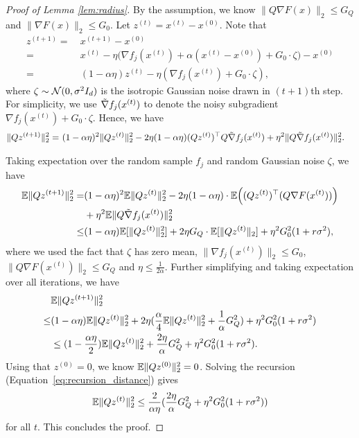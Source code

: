 \begin{proof}[Proof of Lemma \ref{lem:radius}]
By the assumption, we know $\|Q \nabla F(x)\|_2\le G_Q$ and $\| \nabla F(x)\|_2\leq G_0$.
Let $z^{(t)}=x^{(t)}-x^{(0)}$. Note that
\begin{align*}
    z^{(t+1)}=& ~ x^{(t+1)}-x^{(0)}\\
    =& ~ x^{(t)}-\eta\Big(\nabla f_j(x^{(t)})+\alpha(x^{(t)}-x^{(0)})+G_{0}\cdot \zeta\Big)-x^{(0)}\\
    =& ~ (1-\alpha\eta)z^{(t)}-\eta(\nabla f_{j}(x^{(t)})+G_{0}\cdot\zeta ),
\end{align*}
where $\zeta\sim \mathcal N(0,\sigma^{2}I_d)$ is the isotropic Gaussian noise drawn in $(t+1)$th step. 
For simplicity, we use $\Tilde{\nabla} f_j(x^{(t)})$ to denote the noisy subgradient $\nabla f_{j}(x^{(t)})+G_{0}\cdot\zeta$.
Hence, we have
\begin{align*}
    \|Qz^{(t+1)}\|_2^2=& ~ (1-\alpha\eta)^2\|Qz^{(t)}\|_2^2-2\eta(1-\alpha\eta)( Qz^{(t)})^\top Q\Tilde{\nabla} f_j(x^{(t)})+\eta^2\|Q\Tilde{\nabla} f_j(x^{(t)})\|_2^2.
\end{align*}

Taking expectation over the random sample $f_j$ and random Gaussian noise $\zeta$, we have
\begin{align*}
\mathbb{E}\|Qz^{(t+1)}\|_{2}^{2}= & (1-\alpha\eta)^{2}\mathbb{E}\|Qz^{(t)}\|_{2}^{2}-2\eta(1-\alpha\eta)\cdot\mathbb{E}\Big((Qz^{(t)})^{\top}(Q\nabla F(x^{(t)}))\Big) \\
 & +\eta^{2}\mathbb{E}\|Q\Tilde{\nabla} f_j(x^{(t)})\|_{2}^{2}\\
\leq & (1-\alpha\eta)\mathbb{E}[\|Qz^{(t)}\|_{2}^{2}]+2 \eta G_{Q}\cdot\mathbb{E}[\|Qz^{(t)}\|_{2}]+\eta^{2}G_{0}^{2}(1+r\sigma^{2}),
\end{align*}
where we used the fact that $\zeta$ has zero mean, $\|\nabla f_{j}(x^{(t)})\|_{2}\leq G_{0}$, $\|Q\nabla F(x^{(t)})\|_{2}\leq G_{Q}$ and $\eta\leq\frac{1}{2\alpha}$. 
Further simplifying and taking expectation over all iterations, we have
\begin{align}
\label{eq:recursion_distance}
& \mathbb{E}\|Qz^{(t+1)}\|_{2}^{2} \\
\leq& (1-\alpha\eta)\mathbb{E}\|Qz^{(t)}\|_{2}^{2}+2\eta(\frac{\alpha}{4}\mathbb{E}\|Qz^{(t)}\|_{2}^{2}+\frac{1}{\alpha}G_{Q}^{2})+\eta^{2}G_{0}^{2}(1+r\sigma^{2}) \nonumber\\
 & \leq(1-\frac{\alpha\eta}{2})\mathbb{E}\|Qz^{(t)}\|_{2}^{2}+\frac{2 \eta}{\alpha}G_{Q}^{2}+\eta^{2}G_{0}^{2}(1+r\sigma^{2}).
\end{align}
Using that $z^{(0)}=0$, we know $\mathbb{E}\|Qz^{(0)}\|_2^2=0$.
Solving the recursion (Equation~\eqref{eq:recursion_distance}) gives 
\[
\mathbb{E}\|Qz^{(t)}\|_{2}^{2}\leq\frac{2}{\alpha\eta}(\frac{2 \eta}{\alpha}G_{Q}^{2}+\eta^{2}G_{0}^{2}(1+r\sigma^{2}))
\]
for all $t$. 
This concludes the proof.
\end{proof}


